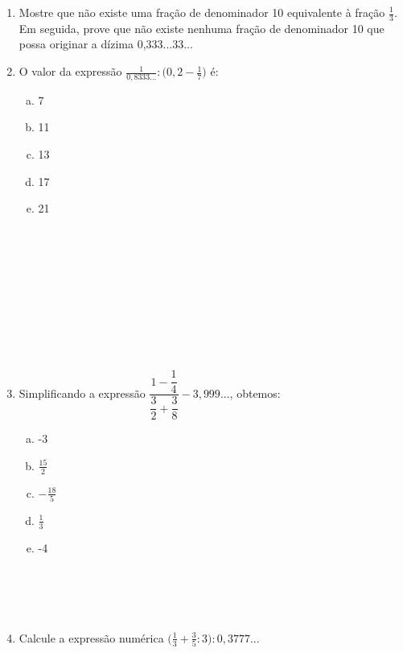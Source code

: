 \documentclass[a4paper,14pt]{article}
\begin{document}
\begin{multicols}{2}
\begin{enumerate}
\begin{enumerate}[a)]
			\end{enumerate}
			\item Mostre que não existe uma fração de denominador 10 equivalente à fração $\frac{1}{3}$. Em seguida, prove que não existe nenhuma fração de denominador 10 que possa originar a dízima 0,333...33... \newpage
			\item O valor da expressão $\frac{1}{0,8333...} : \bigg(0,2 - \frac{1}{7}\bigg)$ é:
			\begin{enumerate}[a)]
				\item 7
				\item 11
				\item 13
				\item 17
				\item 21 \\\\\\\\\\\\\\\\\\\\
			\end{enumerate}
			\item Simplificando a expressão $\dfrac{1 - \dfrac{1}{4}}{\dfrac{3}{2} + \dfrac{3}{8}} - 3,999...$, obtemos: 
			\begin{enumerate}[a)]
				\item -3
				\item $\frac{15}{2}$
				\item $-\frac{18}{5}$
				\item $\frac{1}{3}$
				\item -4 \\\\\\\\\\
			\end{enumerate}
			\item Calcule a expressão numérica $\bigg(\frac{1}{3} + \frac{3}{5} : 3\bigg):0,3777...$ \\\\\\\\\\\\\\\\\\\\\\\\\\\\

\end{enumerate}
\end{multicols}
\end{document}

